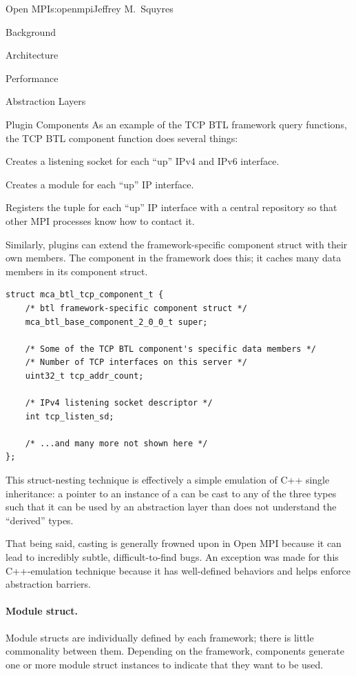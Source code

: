 \begin{aosachapter}{Open MPI}{s:openmpi}{Jeffrey M.\ Squyres}
\begin{aosasect1}{Background}
\begin{aosasect1}{Architecture}
\begin{aosasect2}{Performance}
\begin{aosasect2}{Abstraction Layers}
\begin{aosasect2}{Plugin Components}
As an example of the TCP BTL framework query functions, the TCP BTL
component  function does several things:
\begin{aosaitemize}
\item Creates a listening socket for each ``up'' IPv4 and IPv6 interface.
\item Creates a module for each ``up'' IP interface.
\item Registers the tuple  for each ``up'' IP
  interface with a central repository so that other MPI processes know
  how to contact it.
\end{aosaitemize}

Similarly, plugins can extend the framework-specific component struct
with their own members.
%
The  component in the  framework does this; it
caches many data members in its component struct.

\begin{verbatim}
struct mca_btl_tcp_component_t {
    /* btl framework-specific component struct */ 
    mca_btl_base_component_2_0_0_t super;

    /* Some of the TCP BTL component's specific data members */
    /* Number of TCP interfaces on this server */
    uint32_t tcp_addr_count;
    
    /* IPv4 listening socket descriptor */
    int tcp_listen_sd;

    /* ...and many more not shown here */
};
\end{verbatim}

This struct-nesting technique is effectively a simple emulation of C++
single inheritance: a pointer to an instance of a  can be cast to any of the
three types such that it can be used by an abstraction layer than does
not understand the ``derived'' types.

That being said, casting is generally frowned upon in Open MPI because
it can lead to incredibly subtle, difficult-to-find bugs.  
%
An exception was made for this C++-emulation technique because it has
well-defined behaviors and helps enforce abstraction barriers.


\paragraph{Module struct.}

Module structs are individually defined by each framework; there is
little commonality between them.
%
Depending on the framework, components generate one or more module
struct instances to indicate that they want to be used.


\end{aosasect2}
\end{aosasect2}
\end{aosasect2}
\end{aosasect1}
\end{aosasect1}
\end{aosachapter}
